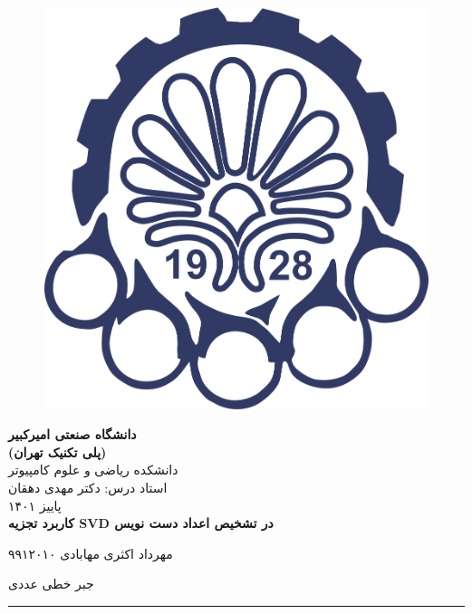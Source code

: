 
	\begin{figure}[t]
		\centering
		\includegraphics[width=0.6\linewidth]{assets/logo.png}
	\end{figure}

	\begin{center}

	\textbf{\huge{ دانشگاه صنعتی امیرکبیر }}
	\\
	
	\textbf{\large{ (پلی تکنیک تهران) }}
	\\[30pt]
	
	\Large{ دانشکده ریاضی و علوم کامپیوتر }
	\\
	{\large استاد درس: دکتر مهدی دهقان}
	\\
	پاییز ۱۴۰۱
	\\[30pt]

	\textbf{\Huge کاربرد تجزیه SVD در تشخیص اعداد دست نویس} 
	\\[50pt]
	
	\end{center}
	مهرداد اکثری مهابادی 
	\hfill
	۹۹۱۲۰۱۰
	
	\hfill 
	جبر خطی عددی
	\rule[0pt]{\linewidth}{1pt}
	
